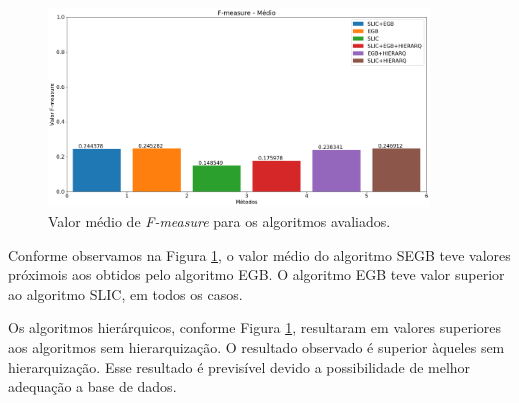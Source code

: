 \begin{document}

\begin{figure}[ht]
\centering
\includegraphics[width=0.9\textwidth]{fmeasure_avg.png}
\caption{Valor médio de \textit{F-measure} para os algoritmos avaliados.}
\label{fig:FMEASURE_AVG}
\end{figure}

Conforme observamos na Figura \ref{fig:FMEASURE_AVG}, o valor médio do algoritmo SEGB teve valores próximois aos obtidos pelo algoritmo EGB. O algoritmo EGB teve valor superior ao algoritmo SLIC, em todos os casos.

Os algoritmos hierárquicos, conforme Figura \ref{fig:FMEASURE_AVG}, resultaram em valores superiores aos algoritmos sem hierarquização. O resultado observado é superior àqueles sem hierarquização. Esse resultado é previsível devido a possibilidade de melhor adequação a base de dados.
\end{document}

